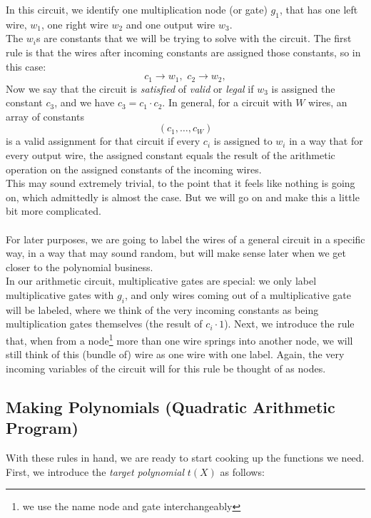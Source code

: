 \documentclass[11pt,oneside]{article}
\theoremstyle{definition}
\theoremstyle{remark}
\numberwithin{equation}{section}
\begin{document}
In this circuit, we
identify one multiplication node (or gate) $g_1$, that has one left wire, $w_1$,
one right wire $w_2$ and one output wire $w_3$.\\ The $w_i$s are constants that
we will be trying to solve with the circuit. The first rule is that the wires
after incoming constants are assigned those constants, so in this case:
$$c_1\rightarrow w_1,\,\,c_2\rightarrow w_2,$$ Now we say that the circuit is
\emph{satisfied} of \emph{valid} or \emph{legal} if $w_3$ is assigned the
constant $c_3$, and we have $c_3=c_1\cdot c_2$. In general, for a circuit with
$W$ wires, an array of constants $$(c_1,\ldots,c_W)$$ is a valid assignment for
that circuit if every $c_i$ is assigned to $w_i$ in a way that for every output
wire, the assigned constant equals the result of the arithmetic operation on the
assigned constants of the incoming wires.\\ This may sound extremely trivial, to
the point that it feels like nothing is going on, which admittedly is almost the
case. But we will go on and make this a little bit more complicated.\\ \\ For
later purposes, we are going to label the wires of a general circuit in a
specific way, in a way that may sound random, but will make sense later when we
get closer to the polynomial business.\\ In our arithmetic circuit,
multiplicative gates are special: we only label multiplicative gates with $g_i$,
and only wires coming out of a multiplicative gate will be labeled, where we
think of the very incoming constants as being multiplication gates themselves
(the result of $c_i \cdot 1$). Next, we introduce the rule that, when from a
node\footnote{we use the name node and gate interchangeably} more than one wire
springs into another node, we will still think of this (bundle of) wire as one
wire with one label. Again, the very incoming variables of the circuit will for
this rule be thought of as nodes.

\subsection{Making Polynomials (Quadratic Arithmetic Program)}

With these rules in hand, we are ready to start cooking up the functions we
need. First, we introduce the \emph{target polynomial} $t(X)$ as follows:
\end{document}
